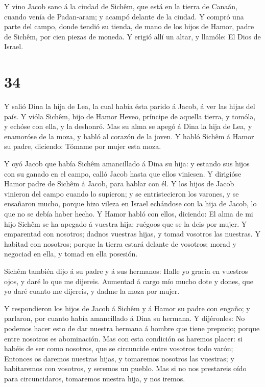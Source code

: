  Y vino Jacob sano á la ciudad de Sichêm, que está en la
tierra de Canaán, cuando venía de Padan-aram; y acampó delante de la
ciudad.  Y compró una parte del campo, donde tendió su
tienda, de mano de los hijos de Hamor, padre de Sichêm, por cien piezas
de moneda.  Y erigió allí un altar, y llamóle: El Dios de
Israel.

\hypertarget{section-33}{%
\section{34}\label{section-33}}

 Y salió Dina la hija de Lea, la cual había ésta parido á
Jacob, á ver las hijas del país.  Y vióla Sichêm, hijo de
Hamor Heveo, príncipe de aquella tierra, y tomóla, y echóse con ella, y
la deshonró.  Mas su alma se apegó á Dina la hija de Lea, y
enamoróse de la moza, y habló al corazón de la joven.  Y
habló Sichêm á Hamor su padre, diciendo: Tómame por mujer esta moza.

 Y oyó Jacob que había Sichêm amancillado á Dina su hija: y
estando sus hijos con su ganado en el campo, calló Jacob hasta que ellos
viniesen.  Y dirigióse Hamor padre de Sichêm á Jacob, para
hablar con él.  Y los hijos de Jacob vinieron del campo
cuando lo supieron; y se entristecieron los varones, y se ensañaron
mucho, porque hizo vileza en Israel echándose con la hija de Jacob, lo
que no se debía haber hecho.  Y Hamor habló con ellos,
diciendo: El alma de mi hijo Sichêm se ha apegado á vuestra hija;
ruégoos que se la deis por mujer.  Y emparentad con
nosotros; dadnos vuestras hijas, y tomad vosotros las nuestras.
 Y habitad con nosotros; porque la tierra estará delante de
vosotros; morad y negociad en ella, y tomad en ella posesión.

 Sichêm también dijo á su padre y á sus hermanos: Halle yo
gracia en vuestros ojos, y daré lo que me dijereis. 
Aumentad á cargo mío mucho dote y dones, que yo daré cuanto me dijereis,
y dadme la moza por mujer.

 Y respondieron los hijos de Jacob á Sichêm y á Hamor su
padre con engaño; y parlaron, por cuanto había amancillado á Dina su
hermana.  Y dijéronles: No podemos hacer esto de dar
nuestra hermana á hombre que tiene prepucio; porque entre nosotros es
abominación.  Mas con esta condición os haremos placer: si
habéis de ser como nosotros, que se circuncide entre vosotros todo
varón;  Entonces os daremos nuestras hijas, y tomaremos
nosotros las vuestras; y habitaremos con vosotros, y seremos un pueblo.
 Mas si no nos prestareis oído para circuncidaros,
tomaremos nuestra hija, y nos iremos.

